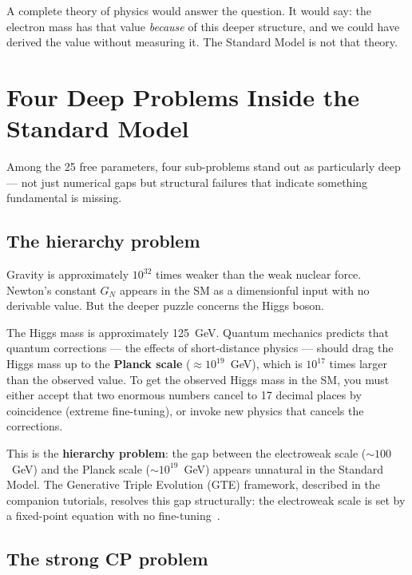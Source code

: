 \documentclass[11pt,a4paper]{article}
\newcommand{\term}[1]{\textbf{#1}}
\begin{document}
A complete theory of physics would answer the question.
It would say: the electron mass has that value \emph{because} of this
deeper structure, and we could have derived the value without measuring it.
The Standard Model is not that theory.

\section{Four Deep Problems Inside the Standard Model}
\label{sec:deep}

Among the 25 free parameters, four sub-problems stand out as particularly
deep --- not just numerical gaps but structural failures that indicate
something fundamental is missing.

\subsection{The hierarchy problem}

Gravity is approximately $10^{32}$ times weaker than the weak nuclear force.
Newton's constant $G_N$ appears in the SM as a dimensionful input with
no derivable value.
But the deeper puzzle concerns the Higgs boson.

The Higgs mass is approximately 125~GeV.
Quantum mechanics predicts that quantum corrections --- the effects of
short-distance physics --- should drag the Higgs mass up to the
\term{Planck scale} ($\approx 10^{19}$~GeV), which is $10^{17}$ times larger
than the observed value.
To get the observed Higgs mass in the SM, you must either accept that
two enormous numbers cancel to 17 decimal places by coincidence
(extreme fine-tuning), or invoke new physics that cancels the corrections.

This is the \term{hierarchy problem}: the gap between the electroweak scale
($\sim 100$~GeV) and the Planck scale ($\sim 10^{19}$~GeV) appears unnatural
in the Standard Model.
The Generative Triple Evolution (GTE) framework, described in the companion
tutorials, resolves this gap structurally: the electroweak scale is set by a
fixed-point equation with no fine-tuning~\cite{SpivackSRRG}.

\subsection{The strong CP problem}
\end{document}
